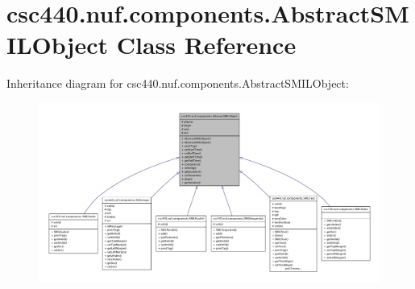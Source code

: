 \hypertarget{classcsc440_1_1nuf_1_1components_1_1_abstract_s_m_i_l_object}{\section{csc440.\-nuf.\-components.\-Abstract\-S\-M\-I\-L\-Object Class Reference}
\label{classcsc440_1_1nuf_1_1components_1_1_abstract_s_m_i_l_object}
}


Inheritance diagram for csc440.\-nuf.\-components.\-Abstract\-S\-M\-I\-L\-Object\-:
\nopagebreak
\begin{figure}[H]
\begin{center}
\leavevmode
\includegraphics[width=350pt]{classcsc440_1_1nuf_1_1components_1_1_abstract_s_m_i_l_object__inherit__graph}
\end{center}
\end{figure}
